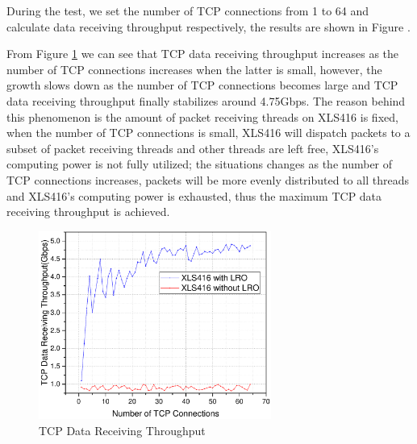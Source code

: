 \documentclass[conference]{IEEEtran}
\begin{document}
During the test, we set the number of TCP connections from 1 to 64 and calculate data receiving throughput respectively, the results are shown in Figure .

From Figure \ref{result} we can see that TCP data receiving throughput increases as the number of TCP connections increases when the latter is small, however, the growth slows down as the number of TCP connections becomes large and TCP data receiving throughput finally stabilizes around 4.75Gbps. The reason behind this phenomenon is the amount of packet receiving threads on XLS416 is fixed, when the number of TCP connections is small, XLS416 will dispatch packets to a subset of packet receiving threads and other threads are left free, XLS416's computing power is not fully utilized; the situations changes as the number of TCP connections increases, packets will be more evenly distributed to all threads and XLS416's computing power is exhausted, thus the maximum TCP data receiving throughput is achieved.
\begin{figure}[!t]
\centering
\includegraphics[width=3.0in]{result}
\caption{TCP Data Receiving Throughput}
\label{result}
\end{figure}
\end{document}
